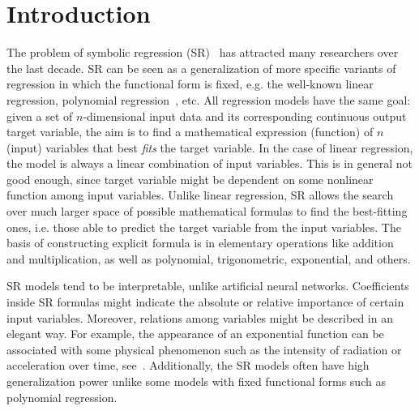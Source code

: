 \documentclass[a4paper,12pt]{elsarticle}
\begin{document}
	
	\section{Introduction}\label{sec:introduction}
	
	The problem of symbolic regression (SR)~\cite{billard2002symbolic} has attracted many researchers over the last decade. SR can be seen as a generalization of more specific variants of regression in which the functional form is fixed, e.g. the well-known linear regression, polynomial regression~\cite{stimson1978interpreting}, etc. All regression models have the same goal: given a set of $n$-dimensional input data and its corresponding continuous output target variable, the aim is to find a  mathematical expression (function) of $n$ (input) variables that best \emph{fits} the target variable.  %
	In the case of linear regression, the model is always a linear combination of input variables. This is in general not good enough, since target variable might be dependent on some nonlinear function among input variables. Unlike linear regression, SR allows the search over much larger space of possible mathematical formulas to find the best-fitting ones, i.e. those able to predict the target variable from the input variables. The basis of constructing explicit formula is in elementary operations like addition and multiplication, as well as polynomial, trigonometric, exponential, and others.  
	
	SR models tend to be interpretable, unlike artificial neural networks. Coefficients inside SR formulas might indicate the absolute or relative importance of certain input variables. Moreover, relations among variables might be described in an elegant way. For example, the appearance of an exponential function can be associated with some physical phenomenon such as the intensity of radiation or acceleration over time, see~\cite{udrescu2020ai}. Additionally, the SR models often have high generalization power unlike some models with fixed functional forms such as polynomial regression. 
	
\end{document}
